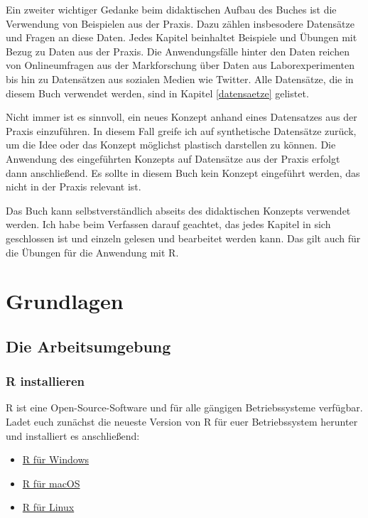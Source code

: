 \documentclass[
]{book}
\providecommand{\tightlist}{%
  \setlength{\itemsep}{0pt}\setlength{\parskip}{0pt}}
\begin{document}
Ein zweiter wichtiger Gedanke beim didaktischen Aufbau des Buches ist die Verwendung von Beispielen aus der Praxis. Dazu zählen insbesodere Datensätze und Fragen an diese Daten. Jedes Kapitel beinhaltet Beispiele und Übungen mit Bezug zu Daten aus der Praxis. Die Anwendungsfälle hinter den Daten reichen von Onlineumfragen aus der Markforschung über Daten aus Laborexperimenten bis hin zu Datensätzen aus sozialen Medien wie Twitter. Alle Datensätze, die in diesem Buch verwendet werden, sind in Kapitel \ref{datensaetze} gelistet.

Nicht immer ist es sinnvoll, ein neues Konzept anhand eines Datensatzes aus der Praxis einzuführen. In diesem Fall greife ich auf synthetische Datensätze zurück, um die Idee oder das Konzept möglichst plastisch darstellen zu können. Die Anwendung des eingeführten Konzepts auf Datensätze aus der Praxis erfolgt dann anschließend. Es sollte in diesem Buch kein Konzept eingeführt werden, das nicht in der Praxis relevant ist.

Das Buch kann selbstverständlich abseits des didaktischen Konzepts verwendet werden. Ich habe beim Verfassen darauf geachtet, das jedes Kapitel in sich geschlossen ist und einzeln gelesen und bearbeitet werden kann. Das gilt auch für die Übungen für die Anwendung mit R.

\hypertarget{part-grundlagen}{%
\part*{Grundlagen}\label{part-grundlagen}}

\hypertarget{die-arbeitsumgebung}{%
\chapter{Die Arbeitsumgebung}\label{die-arbeitsumgebung}}

\hypertarget{r-installieren}{%
\section{R installieren}\label{r-installieren}}

R ist eine Open-Source-Software und für alle gängigen Betriebssysteme verfügbar. Ladet euch zunächst die neueste Version von R für euer Betriebssystem herunter und installiert es anschließend:

\begin{itemize}
\tightlist
\item
  \href{https://cran.r-project.org/bin/windows/base/}{R für Windows}
\item
  \href{https://cran.r-project.org/bin/macosx/}{R für macOS}
\item
  \href{https://cran.r-project.org/bin/linux/}{R für Linux}
\end{itemize}
\end{document}

